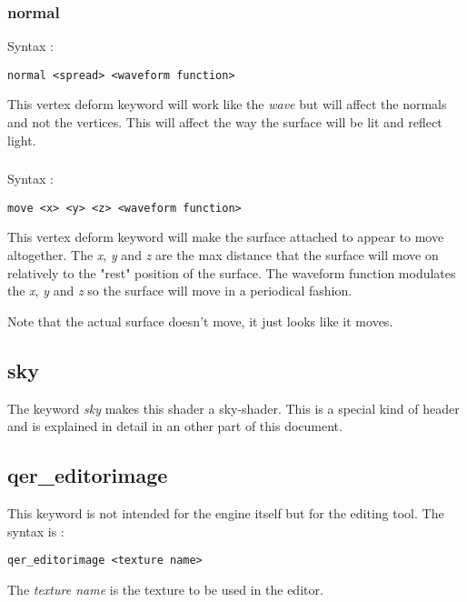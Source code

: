 \documentclass[12pt, titlepage]{amsart}
\begin{document}
\subsubsection{normal}
Syntax :
\begin{verbatim}
normal <spread> <waveform function>
\end{verbatim}

This vertex deform keyword will work like the \textit{wave} but will affect the normals and
not the vertices. This will affect the way the surface will be lit and reflect light.

\subsubsection{}
Syntax :
\begin{verbatim}
move <x> <y> <z> <waveform function>
\end{verbatim}

This vertex deform keyword will make the surface attached to appear to move altogether.
The \textit{x}, \textit{y} and \textit{z} are the max distance that the surface will
move on relatively to the "rest" position of the surface. The waveform function modulates
the \textit{x}, \textit{y} and \textit{z} so the surface will move in a periodical fashion.

Note that the actual surface doesn't move, it just looks like it moves.

\subsection{sky}
The keyword \textit{sky} makes this shader a sky-shader. This is a
special kind of header and is explained in detail in an other part
of this document.

\subsection{qer\_editorimage}
This keyword is not intended for the engine itself but for the editing tool.
The syntax is :

\begin{verbatim}
qer_editorimage <texture name>
\end{verbatim}

The \textit{texture name} is the texture to be used in the editor.
\end{document}
